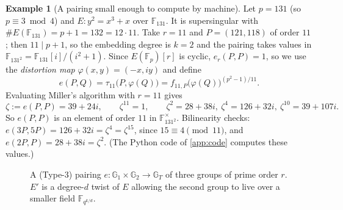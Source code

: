 \documentclass[11pt,a4paper,oneside]{book}
\theoremstyle{plain}
\theoremstyle{definition}
\newtheorem{example}[theorem]{Example}
\theoremstyle{remark}
\newcommand{\F}{\mathbb{F}}
\newcommand{\DDH}{\mathsf{DDH}}
\begin{document}
\begin{example}[A pairing small enough to compute by machine]\label{ex:toypairing}
Let $p=131$ (so $p\equiv3\bmod4$) and $E:y^2=x^3+x$ over $\F_{131}$. It is supersingular with $\#E(\F_{131})=p+1=132=12\cdot11$. Take $r=11$ and $P=(121,118)$ of order $11$; then $11\mid p+1$, so the embedding degree is $k=2$ and the pairing takes values in $\F_{131^2}=\F_{131}[i]/(i^2+1)$. Since $E(\F_p)[r]$ is cyclic, $e_r(P,P)=1$, so we use the \emph{distortion map} $\varphi(x,y)=(-x,iy)$ and define
\[
e(P,Q)=\tau_{11}\big(P,\varphi(Q)\big)=f_{11,P}\big(\varphi(Q)\big)^{(p^2-1)/11}.
\]
Evaluating Miller's algorithm with $r=11$ gives
\[
\zeta:=e(P,P)=39+24i,\qquad\zeta^{11}=1,\qquad\zeta^2=28+38i,\ \zeta^4=126+32i,\ \zeta^{10}=39+107i.
\]
So $e(P,P)$ is an element of order $11$ in $\F_{131^2}^\times$. Bilinearity checks: $e(3P,5P)=126+32i=\zeta^{4}=\zeta^{15}$, since $15\equiv4\pmod{11}$, and $e(2P,P)=28+38i=\zeta^2$. (The Python code of \cref{app:code} computes these values.)
\end{example}

\begin{figure}[ht]
\centering
{}
\caption{A (Type-3) pairing $e:\mathbb G_1\times\mathbb G_2\to\mathbb G_T$ of three groups of prime order $r$. $E'$ is a degree-$d$ twist of $E$ allowing the second group to live over a smaller field $\F_{q^{k/d}}$.}
\label{fig:pairing}
\end{figure}
\end{document}
